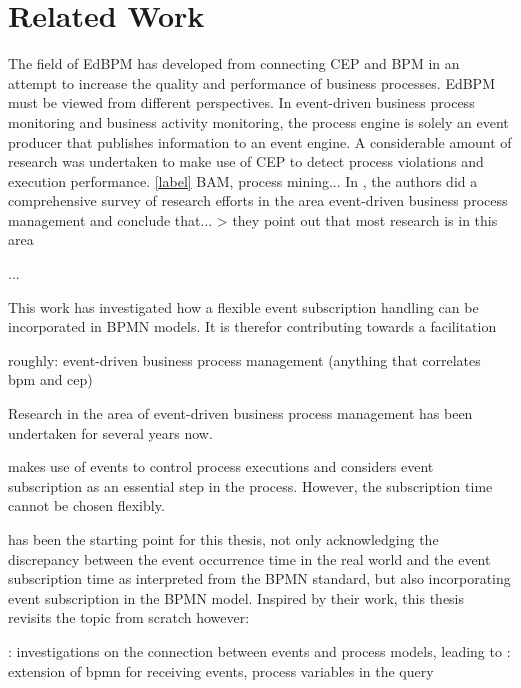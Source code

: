 \chapter{Related Work}\label{ch:relatedwork}

The field of \ac{EdBPM} has developed from connecting \ac{CEP} and \ac{BPM} in an attempt to increase the quality and performance of business processes.
\acs{EdBPM} must be viewed from different perspectives.
In event-driven business process monitoring and business activity monitoring, the process engine is solely an event producer that publishes information to an event engine.
A considerable amount of research was undertaken to make use of CEP to detect process violations and execution performance. 
\ref{label}
BAM, process mining... \cite{janiesch:poc-eventdriven-bam}
In \cite{Krumeich2014EventDrivenBP}, the authors did a comprehensive survey of research efforts in the area event-driven business process management and conclude that... > they point out that most research is in this area

...

This work has investigated how a flexible event subscription handling can be incorporated in BPMN models.
It is therefor contributing towards a facilitation 

roughly: event-driven business process management (anything that correlates bpm and cep)

Research in the area of event-driven business process management has been undertaken for several years now.



\cite{Pufahl2017} makes use of events to control process executions and considers event subscription as an essential step in the process. However, the subscription time cannot be chosen flexibly.

\cite{mandal:2017} has been the starting point for this thesis, not only acknowledging the discrepancy between the event occurrence time in the real world and the event subscription time as interpreted from the BPMN standard, but also incorporating event subscription in the BPMN model.
Inspired by their work, this thesis revisits the topic from scratch
however: 

\cite{Cabanillas2014}: investigations on the connection between events and process models, leading to \cite{Baumgrass2016}: extension of bpmn for receiving events, process variables in the query

